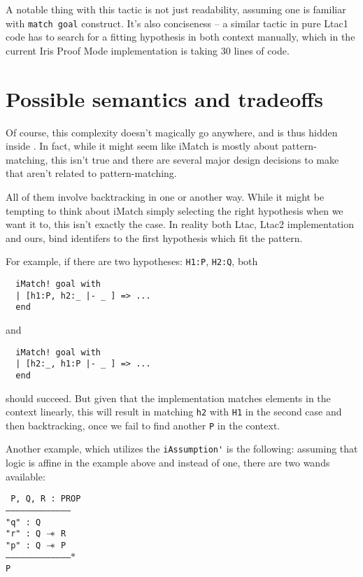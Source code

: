 A notable thing with this tactic is not just readability, assuming one is familiar with \lstinline|match goal| construct.
It's also conciseness -- a similar tactic in pure Ltac1 code has to search for a fitting hypothesis in both context manually, which in the current Iris Proof Mode implementation is taking 30 lines of code.

\section{Possible semantics and tradeoffs}

Of course, this complexity doesn't magically go anywhere, and is thus hidden inside \iMatch.
In fact, while it might seem like iMatch is mostly about pattern-matching, this isn't true and there are several major design decisions to make that aren't related to pattern-matching.

All of them involve backtracking in one or another way.
While it might be tempting to think about iMatch simply selecting the right hypothesis when we want it to, this isn't exactly the case.
In reality both Ltac, Ltac2 implementation and ours, bind identifers to the first hypothesis which fit the pattern.

For example, if there are two hypotheses: \lstinline|H1:P|, \lstinline|H2:Q|,
both
\begin{lstlisting}
  iMatch! goal with
  | [h1:P, h2:_ |- _ ] => ...
  end
\end{lstlisting}
and
\begin{lstlisting}
  iMatch! goal with
  | [h2:_, h1:P |- _ ] => ...
  end
\end{lstlisting}
should succeed.
But given that the implementation matches elements in the context linearly, this will result in matching \lstinline|h2| with \lstinline|H1| in the second case and then backtracking, once we fail to find another \lstinline|P| in the context.

Another example, which utilizes the \lstinline|iAssumption'| is the following: assuming that logic is affine in the example above and instead of one, there are two wands available:

\texttt{
P, Q, R : PROP\\
---------------------------------------\\
"q" : Q\\
"r" : Q $\mathrel{-\mkern-6mu*}$ R\\
"p" : Q $\mathrel{-\mkern-6mu*}$ P\\
--------------------------------------$\ast$\\
P
}

